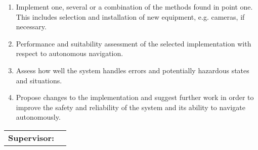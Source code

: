 \begin{titlingpage}
\begin{enumerate}
	\item Implement one, several or a combination of the methods found in point one. This includes selection and installation of new equipment, e.g. cameras, if necessary. 
	
	\item Performance and suitability assessment of the selected implementation with respect to autonomous navigation.
	
	\item Assess how well the system handles errors and potentially hazardous states and situations.
	
	\item Propose changes to the implementation and suggest further work in order to improve the safety and reliability of the system and its ability to navigate autonomously.

	
\end{enumerate}
\vspace{6ex}

\noindent
\begin{tabular}{@{}p{4cm}l}
\textbf{Supervisor:}			& \thesupervisor \\
\end{tabular}

\end{titlingpage}